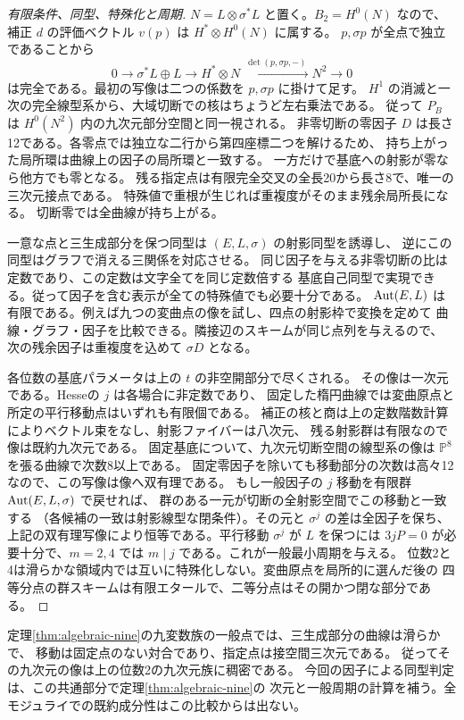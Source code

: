 \begin{proof}[有限条件、同型、特殊化と周期]
$N=L\otimes\sigma^*L$ と置く。$B_2=H^0(N)$ なので、補正 $d$ の評価ベクトル
$v(p)$ は $H^*\otimes H^0(N)$ に属する。
$p,\sigma p$ が全点で独立であることから
\[
 0\longrightarrow \sigma^*L\oplus L\longrightarrow H^*\otimes N
 \xrightarrow{\ \det(p,\sigma p,-)\ } N^2\longrightarrow0
\]
は完全である。最初の写像は二つの係数を $p,\sigma p$ に掛けて足す。
$H^1$ の消滅と一次の完全線型系から、大域切断での核はちょうど左右乗法である。
従って $P_B$ は $H^0(N^2)$ 内の九次元部分空間と同一視される。
非零切断の零因子 $D$ は長さ12である。各零点では独立な二行から第四座標二つを解けるため、
持ち上がった局所環は曲線上の因子の局所環と一致する。
一方だけで基底への射影が零なら他方でも零となる。
残る指定点は有限完全交叉の全長20から長さ8で、唯一の三次元接点である。
特殊値で重根が生じれば重複度がそのまま残余局所長になる。
切断零では全曲線が持ち上がる。

一意な点と三生成部分を保つ同型は $(E,L,\sigma)$ の射影同型を誘導し、
逆にこの同型はグラフで消える三関係を対応させる。
同じ因子を与える非零切断の比は定数であり、この定数は文字全てを同じ定数倍する
基底自己同型で実現できる。従って因子を含む表示が全ての特殊値でも必要十分である。
$\operatorname{Aut}(E,L)$ は有限である。例えば九つの変曲点の像を試し、四点の射影枠で変換を定めて
曲線・グラフ・因子を比較できる。隣接辺のスキームが同じ点列を与えるので、
次の残余因子は重複度を込めて $\sigma D$ となる。

各位数の基底パラメータは上の $t$ の非空開部分で尽くされる。
その像は一次元である。Hesseの $j$ は各場合に非定数であり、
固定した楕円曲線では変曲原点と所定の平行移動点はいずれも有限個である。
補正の核と商は上の定数階数計算によりベクトル束をなし、射影ファイバーは八次元、
残る射影群は有限なので像は既約九次元である。
固定基底について、九次元切断空間の線型系の像は $\mathbb P^8$ を張る曲線で次数8以上である。
固定零因子を除いても移動部分の次数は高々12なので、この写像は像へ双有理である。
もし一般因子の $j$ 移動を有限群 $\operatorname{Aut}(E,L,\sigma)$ で戻せれば、
群のある一元が切断の全射影空間でこの移動と一致する
（各候補の一致は射影線型な閉条件）。その元と $\sigma^j$ の差は全因子を保ち、
上記の双有理写像により恒等である。平行移動 $\sigma^j$ が $L$ を保つには
$3jP=0$ が必要十分で、$m=2,4$ では $m\mid j$ である。これが一般最小周期を与える。
位数2と4は滑らかな領域内では互いに特殊化しない。変曲原点を局所的に選んだ後の
四等分点の群スキームは有限エタールで、二等分点はその開かつ閉な部分である。
\end{proof}

定理\ref{thm:algebraic-nine}の九変数族の一般点では、三生成部分の曲線は滑らかで、
移動は固定点のない対合であり、指定点は接空間三次元である。
従ってその九次元の像は上の位数2の九次元族に稠密である。
今回の因子による同型判定は、この共通部分で定理\ref{thm:algebraic-nine}の
次元と一般周期の計算を補う。全モジュライでの既約成分性はこの比較からは出ない。
